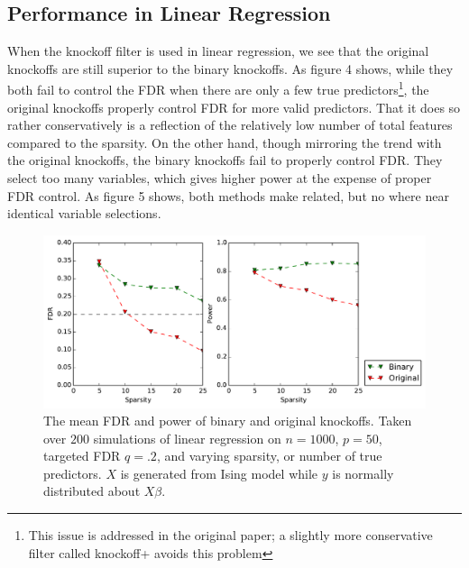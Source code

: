 \documentclass[11pt]{article}
\theoremstyle{definition}
\begin{document}
    \FloatBarrier
\subsection{Performance in Linear Regression} 
    \FloatBarrier
    When the knockoff filter is used in linear regression, we see that the original knockoffs are still superior to the binary knockoffs. As figure 4 shows, while they both fail to control the FDR when there are only a few true predictors\footnote{This issue is addressed in the original paper; a slightly more conservative filter called knockoff+ avoids this problem}, the original knockoffs properly control FDR for more valid predictors. That it does so rather conservatively is a reflection of the relatively low number of total features compared to the sparsity. On the other hand, though mirroring the trend with the original knockoffs, the binary knockoffs fail to properly control FDR. They select too many variables, which gives higher power at the expense of proper FDR control. As figure 5 shows, both methods make related, but no where near identical variable selections. \par
    
    \begin{figure}[h]
        \begin{center}
        \includegraphics[width=14cm]{images/lasso_FDR_power_50}
    \end{center}
    \caption{The mean FDR and power of binary and original knockoffs. Taken over $200$ simulations of linear regression on $n=1000$, $p=50$, targeted FDR $q=.2$, and varying sparsity, or number of true predictors. $X$ is generated from Ising model while $y$ is normally distributed about $X\beta$.}  
    \end{figure}
\end{document}
